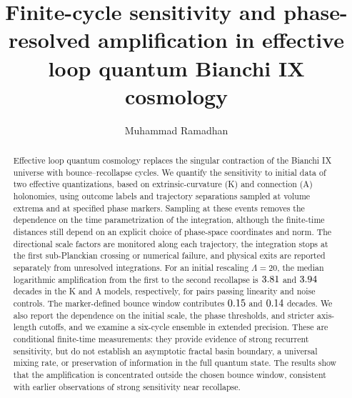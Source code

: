 \documentclass[12pt]{iopjournal}
\newcommand{\Lam}{\Lambda}
\begin{document}

\title{Finite-cycle sensitivity and phase-resolved amplification in effective loop quantum Bianchi IX cosmology}

\author{Muhammad Ramadhan}




\begin{abstract}
Effective loop quantum cosmology replaces the singular contraction of the Bianchi IX universe with
bounce--recollapse cycles. We quantify the sensitivity to initial data of two effective quantizations, based on extrinsic-curvature (K) and connection (A) holonomies, using outcome labels and trajectory separations sampled at volume extrema and at specified phase markers. Sampling at these events removes the dependence on the time parametrization of the integration, although the finite-time distances still depend on an explicit choice of phase-space coordinates and norm. The directional scale factors are monitored along each trajectory, the integration stops at the first sub-Planckian crossing or numerical failure, and physical exits are reported separately from unresolved integrations. For an initial rescaling $\Lam=20$, the median logarithmic amplification from the first to the second
recollapse is $3.81$ and $3.94$ decades in the K and A models, respectively, for pairs passing
linearity and noise controls. The marker-defined bounce window contributes $0.15$ and
$0.14$ decades. We also report the dependence on the initial scale, the phase thresholds, and stricter axis-length cutoffs, and we examine a six-cycle ensemble in extended precision. These are conditional finite-time
measurements: they provide evidence of strong recurrent sensitivity, but do not establish an
asymptotic fractal basin boundary, a universal mixing rate, or preservation of information in the full
quantum state. The results show that the amplification is concentrated outside the chosen bounce window,
consistent with earlier observations of strong sensitivity near recollapse.
\end{abstract}
\end{document}
